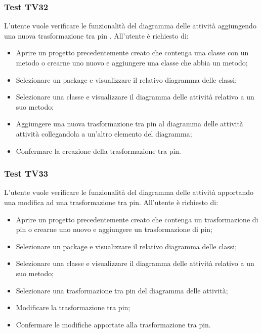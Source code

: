 \documentclass[../PianoDiQualifica.tex]{subfiles}
\begin{document}
	\subsubsection{Test TV32} 
	L'utente vuole verificare le funzionalità del diagramma delle attività aggiungendo una nuova trasformazione tra pin . 
	All'utente è richiesto di: 
	\begin{itemize} 
		\item Aprire un progetto precedentemente creato che contenga una classe con un metodo o crearne uno nuovo e aggiungere una classe che abbia un metodo;
		\item Selezionare un package e visualizzare il relativo diagramma delle classi; 
		\item Selezionare una classe e visualizzare il diagramma delle attività relativo a un suo metodo; %
		\item Aggiungere una nuova trasformazione tra pin al diagramma delle attività attività collegandola a un'altro elemento del diagramma; 
		\item Confermare la creazione della trasformazione tra pin.%
	\end{itemize} 
	
	\subsubsection{Test TV33} 
	L'utente vuole verificare le funzionalità del diagramma delle attività apportando una modifica ad una trasformazione tra pin. 
	All'utente è richiesto di: 
	\begin{itemize} 
		\item Aprire un progetto precedentemente creato che contenga un trasformazione di pin o crearne uno nuovo e aggiungere un trasformazione di pin;
		\item Selezionare un package e visualizzare il relativo diagramma delle classi; 
		\item Selezionare una classe e visualizzare il diagramma delle attività relativo a un suo metodo; 
		\item Selezionare una trasformazione tra pin del diagramma delle attività;
		\item Modificare la trasformazione tra pin;%
		\item Confermare le modifiche apportate alla trasformazione tra pin. 
	\end{itemize} 
	
	
\end{document}
